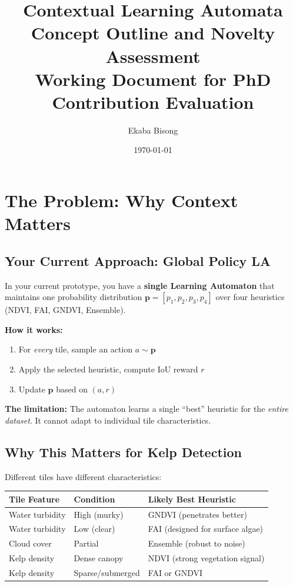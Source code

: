 \documentclass[11pt]{article}
\title{\textbf{Contextual Learning Automata}\\[0.5em]
\large Concept Outline and Novelty Assessment\\[0.3em]
\normalsize Working Document for PhD Contribution Evaluation}
\author{Ekaba Bisong}
\date{\today}
\begin{document}
\maketitle
\tableofcontents
\newpage

\section{The Problem: Why Context Matters}

\subsection{Your Current Approach: Global Policy LA}

In your current prototype, you have a \textbf{single Learning Automaton} that maintains one probability distribution $\mathbf{p} = [p_1, p_2, p_3, p_4]$ over four heuristics (NDVI, FAI, GNDVI, Ensemble).

\textbf{How it works:}
\begin{enumerate}
  \item For \textit{every} tile, sample an action $a \sim \mathbf{p}$
  \item Apply the selected heuristic, compute IoU reward $r$
  \item Update $\mathbf{p}$ based on $(a, r)$
\end{enumerate}

\textbf{The limitation:} The automaton learns a single ``best'' heuristic for the \textit{entire dataset}. It cannot adapt to individual tile characteristics.

\subsection{Why This Matters for Kelp Detection}

Different tiles have different characteristics:

\begin{center}
\begin{tabular}{lll}
\toprule
\textbf{Tile Feature} & \textbf{Condition} & \textbf{Likely Best Heuristic} \\
\midrule
Water turbidity & High (murky) & GNDVI (penetrates better) \\
Water turbidity & Low (clear) & FAI (designed for surface algae) \\
Cloud cover & Partial & Ensemble (robust to noise) \\
Kelp density & Dense canopy & NDVI (strong vegetation signal) \\
Kelp density & Sparse/submerged & FAI or GNDVI \\
\bottomrule
\end{tabular}
\end{center}
\end{document}
